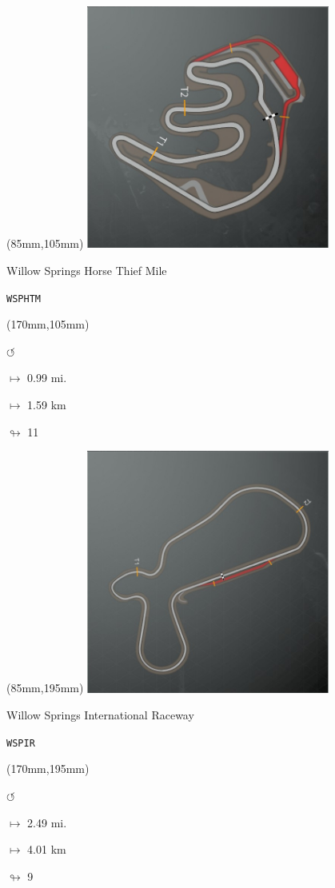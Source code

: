 \begin{textblock*}{80mm}(85mm,105mm)%
\includegraphics[width=80mm]{TR/2015-05-20_00069.png}
\centerline{Willow Springs Horse Thief Mile}
\par\hfill\tiny\tt WSPHTM\\
\end{textblock*}
\begin{textblock*}{30mm}(170mm,105mm)%
\par \Huge$\circlearrowleft$
\Large
\par$\mapsto$ 0.99 mi.
\par$\mapsto$ 1.59 km
\par$\looparrowright$ 11
\end{textblock*}
\begin{textblock*}{80mm}(85mm,195mm)%
\includegraphics[width=80mm]{TR/2015-05-20_00068.png}
\centerline{Willow Springs International Raceway}
\par\hfill\tiny\tt WSPIR\\
\end{textblock*}
\begin{textblock*}{30mm}(170mm,195mm)%
\par \Huge$\circlearrowleft$
\Large
\par$\mapsto$ 2.49 mi.
\par$\mapsto$ 4.01 km
\par$\looparrowright$ 9
\end{textblock*}
\null\newpage

